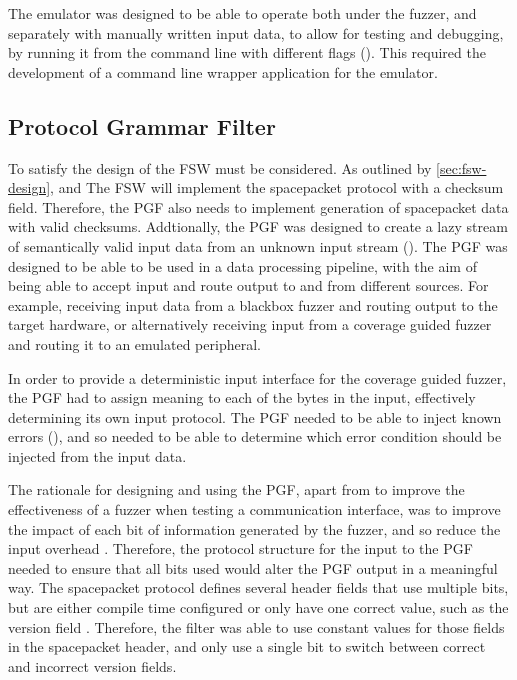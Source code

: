 \documentclass[../report.tex]{subfiles}
\begin{document}
The emulator was designed to be able to operate both under the fuzzer, and
separately with manually written input data, to allow for testing and
debugging, by running it from the command line with different flags
(). This required the development of a command line wrapper
application for the emulator.

\subsection{Protocol Grammar Filter}

To satisfy  the design of the FSW must be considered.
As outlined by \autoref{sec:fsw-design},  and  The
FSW will implement the spacepacket protocol with a checksum field. Therefore,
the PGF also needs to implement generation of spacepacket data with valid
checksums. Addtionally, the PGF was designed to create a lazy stream of
semantically valid input data from an unknown input stream ().
The PGF was designed to be able to be used in a data processing pipeline, with
the aim of being able to accept input and route output to and from different
sources. For example, receiving input data from a blackbox fuzzer and routing
output to the target hardware, or alternatively receiving input from a coverage
guided fuzzer and routing it to an emulated peripheral.

In order to provide a deterministic input interface for the coverage guided
fuzzer, the PGF had to assign meaning to each of the bytes in the input,
effectively determining its own input protocol. The PGF needed to be able to
inject known errors (), and so needed to be able to determine
which error condition should be injected from the input data.

The rationale for designing and using the PGF, apart from to improve the
effectiveness of a fuzzer when testing a communication interface, was to
improve the impact of each bit of information generated by the fuzzer, and so
reduce the input overhead \citep{Fuzzware_2022, Hoedur_2023,
Fuzztruction_2023}. Therefore, the protocol structure for the input to the PGF
needed to ensure that all bits used would alter the PGF output in a meaningful
way. The spacepacket protocol defines several header fields that use multiple
bits, but are either compile time configured or only have one correct value,
such as the version field \citep{Ccsds_spp}. Therefore, the filter was able to
use constant values for those fields in the spacepacket header, and only use a
single bit to switch between correct and incorrect version fields.
\end{document}
